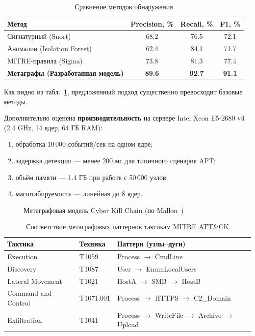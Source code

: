 \begin{table}[ht]
\centering
\caption{Сравнение методов обнаружения}
\label{tab:comparison}
\begin{tabular}{lccc}
\hline
Метод & Precision, \% & Recall, \% & F1, \% \\
\hline
Сигнатурный (Snort) & 68.2 & 76.5 & 72.1 \\
Аномалии (Isolation Forest) & 62.4 & 84.1 & 71.7 \\
MITRE-правила (Sigma) & 73.8 & 81.3 & 77.4 \\
\textbf{Метаграфы (Разработанная модель)} & \textbf{89.6} & \textbf{92.7} & \textbf{91.1} \\
\hline
\end{tabular}
\end{table}

Как видно из табл.~\ref{tab:comparison}, предложенный подход существенно превосходит базовые методы.

Дополнительно оценена \textbf{производительность} на сервере Intel Xeon E5-2680 v4 (2.4 GHz, 14 ядер, 64 ГБ RAM):
\begin{enumerate}
    \item обработка 10\,000 событий/сек на одном ядре;
    \item задержка детекции — менее 200 мс для типичного сценария APT;
    \item объём памяти — 1.4 ГБ при работе с 50\,000 узлов;
    \item масштабируемость — линейная до 8 ядер.
\end{enumerate}

\FloatBarrier
\begin{figure}[ht]
\centering
\resizebox{\textwidth}{!}{}
\caption{Метаграфовая модель Cyber Kill Chain (по Mallon~\cite{mallon2016})}
\end{figure}

\begin{table}[ht]
\centering
\caption{Соответствие метаграфовых паттернов тактикам MITRE ATT\&CK}
\label{tab:mitre-mapping}
\begin{tabular}{lll}
\hline
Тактика & Техника & Паттерн (узлы–дуги) \\
\hline
Execution & T1059 & Process $\rightarrow$ CmdLine \\
Discovery & T1087 & User $\rightarrow$ EnumLocalUsers \\
Lateral Movement & T1021 & HostA $\rightarrow$ SMB $\rightarrow$ HostB \\
Command and Control & T1071.001 & Process $\rightarrow$ HTTPS $\rightarrow$ C2\_Domain \\
Exfiltration & T1041 & Process $\rightarrow$ WriteFile $\rightarrow$ Archive $\rightarrow$ Upload \\
\hline
\end{tabular}
\end{table}

